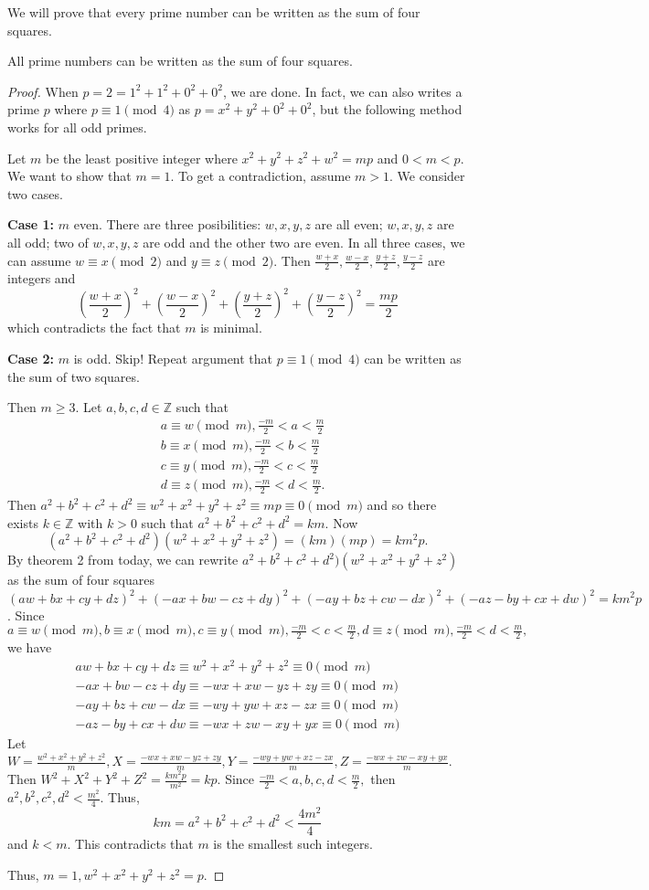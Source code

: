 \documentclass[letterpaper, 11 pt]{article}
\begin{document}
We will prove that every prime number can be written as the sum of four squares. 
\begin{thm}[Lagrange, 1770]
 All prime numbers can be written as the sum of four squares.
\end{thm}
\begin{proof}
 When $p=2=1^2+1^2+0^2+0^2$, we are done. In fact, we can also writes a prime $p$ where $p\equiv 1 \pmod 4$ as $p=x^2+y^2+0^2+0^2$, but the following method works for all odd primes. 
 
 Let $m$ be the least positive integer where $x^2+y^2+z^2+w^2=mp$ and $0<m<p$. We want to show that $m=1$. To get a contradiction, assume $m>1$. We consider two cases.

{\bf Case 1:} $m$ even. There are three posibilities: $w,x,y,z$ are all even;  $w,x,y,z$ are all odd; two of $w,x,y,z$ are odd and the other two are even. In all three cases, we can assume $w\equiv x \pmod 2$ and $y\equiv z \pmod 2$. 
Then $\frac{w+x}{2},\frac{w-x}{2},\frac{y+z}{2},\frac{y-z}{2}$ are integers and \[\left(\frac{w+x}{2}\right)^2+\left(\frac{w-x}{2}\right)^2+\left(\frac{y+z}{2}\right)^2+\left(\frac{y-z}{2}\right)^2=\frac{mp}{2}\] which contradicts the fact that $m$ is minimal.
 

{\bf Case 2:} $m$ is odd.  Skip! Repeat argument that $p\equiv 1 \pmod 4$ can be written as the sum of two squares.

Then $m\geq 3.$ Let $a,b,c,d\in\mathbb{Z}$ such that 
\begin{align*}
&a\equiv w\pmod m, \frac{-m}{2}<a<\frac{m}{2}\\
&b\equiv x\pmod m, \frac{-m}{2}<b<\frac{m}{2}\\
&c\equiv y\pmod m, \frac{-m}{2}<c<\frac{m}{2}\\
&d\equiv z\pmod m, \frac{-m}{2}<d<\frac{m}{2}.
\end{align*}
Then $a^2+b^2+c^2+d^2\equiv w^2+x^2+y^2+z^2\equiv mp\equiv 0\pmod m$ and so there exists $k\in\mathbb{Z}$ with $k>0$ such that $a^2+b^2+c^2+d^2=km$.
Now \[(a^2+b^2+c^2+d^2)( w^2+x^2+y^2+z^2)=(km)(mp)=km^2p.\]
By theorem 2 from today, we can rewrite $a^2+b^2+c^2+d^2)( w^2+x^2+y^2+z^2)$ as the sum of four squares 
$(aw+bx+cy+dz)^2+(-ax+bw-cz+dy)^2+(-ay+bz+cw-dx)^2+(-az-by+cx+dw)^2=km^2p$. Since $a\equiv w\pmod m, b\equiv x\pmod m, c\equiv y\pmod m, \frac{-m}{2}<c<\frac{m}{2}, d\equiv z\pmod m, \frac{-m}{2}<d<\frac{m}{2},$ we have 
\begin{align*}
 aw+bx+cy+dz\equiv w^2+x^2+y^2+z^2\equiv 0 \pmod m\\
-ax+bw-cz+dy\equiv -wx+xw-yz+zy\equiv 0\pmod m\\
-ay+bz+cw-dx\equiv -wy+yw+xz-zx\equiv 0\pmod m\\
-az-by+cx+dw\equiv -wx+zw-xy+yx\equiv 0\pmod m
\end{align*}
Let $W=\frac{w^2+x^2+y^2+z^2}{m}, X=\frac{-wx+xw-yz+zy}{m}, Y=\frac{-wy+yw+xz-zx}{m}, Z=\frac{-wx+zw-xy+yx}{m}$. Then $W^2+X^2+Y^2+Z^2=\frac{km^2p}{m^2}=kp.$ Since $\frac{-m}{2}<a,b,c,d<\frac{m}{2},$ then $a^2,b^2,c^2,d^2<\frac{m^2}{4}$. Thus, \[km=a^2+b^2+c^2+d^2<\frac{4m^2}{4}\] and $k<m$. This contradicts that $m$ is the smallest such integers.

Thus, $m=1, w^2+x^2+y^2+z^2=p$.
\end{proof}
\end{document}
